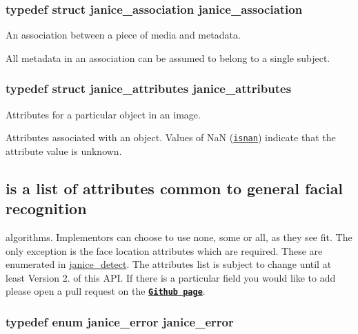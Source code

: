 \subsubsection[{janice\+\_\+association}]{\setlength{\rightskip}{0pt plus 5cm}typedef struct {\bf janice\+\_\+association}  {\bf janice\+\_\+association}}\label{group__janice_ga032bb29ff79b20db76d528b6672280d9}


An association between a piece of media and metadata. 

All metadata in an association can be assumed to belong to a single subject. \hypertarget{group__janice_gaf16b5ce9751b8450f61adb9a957b0fc2}{}
\subsubsection[{janice\+\_\+attributes}]{\setlength{\rightskip}{0pt plus 5cm}typedef struct {\bf janice\+\_\+attributes}  {\bf janice\+\_\+attributes}}\label{group__janice_gaf16b5ce9751b8450f61adb9a957b0fc2}


Attributes for a particular object in an image. 

Attributes associated with an object. Values of {\ttfamily Na\+N} (\href{http://www.cplusplus.com/reference/cmath/isnan/}{\tt isnan}) indicate that the attribute value is unknown.\hypertarget{group__janice_Below}{}\subsection{is a list of attributes common to general facial recognition}\label{group__janice_Below}
algorithms. Implementors can choose to use none, some or all, as they see fit. The only exception is the face location attributes which are required. These are enumerated in \hyperlink{group__janice_gafa4e88d39c9279d985b2e8f8d21e17dc}{janice\+\_\+detect}. The attributes list is subject to change until at least Version 2. of this A\+P\+I. If there is a particular field you would like to add please open a pull request on the \href{https://github.com/Noblis/janice/pulls}{\tt {\bfseries Github page}}. \hypertarget{group__janice_gac9071fe2c752efef60aa3f932a290fda}{}
\subsubsection[{janice\+\_\+error}]{\setlength{\rightskip}{0pt plus 5cm}typedef enum {\bf janice\+\_\+error}  {\bf janice\+\_\+error}}\label{group__janice_gac9071fe2c752efef60aa3f932a290fda}


